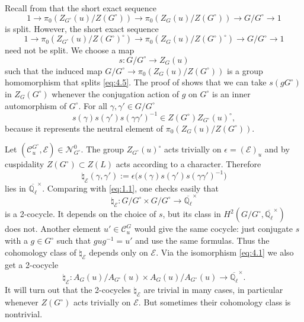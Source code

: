 \documentclass[11pt]{amsart}
\theoremstyle{definition}
\newcommand{\Q}{\mathbb Q}
\def\cC{{\mathcal C}}
\def\cN{{\mathcal N}}
\def\cE{{\mathcal E}}
\begin{document}
Recall from \cite[Lemma 4.2]{ABPS5} that the short exact sequence
\begin{equation}\label{eq:4.5}
1 \to \pi_0 (Z_{G^\circ}(u) / Z (G^\circ)) \to \pi_0 (Z_G (u) / Z(G^\circ)) 
\to G / G^\circ \to 1
\end{equation}
is split. However, the short exact sequence
\begin{equation}\label{eq:4.9}
1 \to \pi_0 (Z_{G^\circ}(u) / Z (G^\circ)^\circ ) \to 
\pi_0 (Z_G (u) / Z(G^\circ)^\circ) \to G / G^\circ \to 1
\end{equation}
need not be split. We choose a map 
\begin{equation}\label{eq:4.10}
s : G / G^\circ \to Z_G (u)  
\end{equation}
such that the induced map $G / G^\circ \to \pi_0 (Z_G (u) / Z(G^\circ))$ 
is a group homomorphism that splits \eqref{eq:4.5}. The proof of 
\cite[Lemma 4.2]{ABPS5} shows that we can take $s (g G^\circ)$ in $Z_G (G^\circ)$ 
whenever the conjugation action of $g$ on $G^\circ$ is an
inner automorphism of $G^\circ$. For all $\gamma,\gamma' \in G / G^\circ$
\[
s(\gamma) s(\gamma') s(\gamma \gamma')^{-1} \in Z(G^\circ) Z_{G^\circ}(u)^\circ ,
\]
because it represents the neutral element of $\pi_0 (Z_G (u) / Z(G^\circ))$.

Let $(\cC_u^{G^\circ},\cE) \in \cN_{G^\circ}^0$. 
The group $Z_{G^\circ}(u)^\circ$ acts trivially on $\epsilon = (\cE)_u$ and by 
cuspidality $Z(G^\circ) \subset Z(L)$ acts according to a character. Therefore
\begin{equation}\label{eq:4.6}
\natural_\cE (\gamma,\gamma') := \epsilon \big( s(\gamma) s(\gamma') 
s(\gamma \gamma')^{-1} \big)  
\end{equation}
lies in $\overline{\Q_{\ell}}^\times$. Comparing with \eqref{eq:1.1}, 
one checks easily that 
\begin{equation}\label{eq:4.12}
\natural_\cE : G / G^\circ \times G / G^\circ \to \overline{\Q_{\ell}}^\times
\end{equation}
is a 2-cocycle. It depends on the choice of $s$, but its class in $H^2 (G/G^\circ,
\overline{\Q_{\ell}}^\times)$ does not. Another element $u' \in \cC_u^G$
would give the same cocycle: just conjugate $s$ with a $g \in G^\circ$ such
that $g u g^{-1} = u'$ and use the same formulas. Thus the cohomology class of
$\natural_\cE$ depends only on $\cE$. 
Via the isomorphism \eqref{eq:4.1} we also get a 2-cocycle
\[
\natural_\cE : A_G (u) / A_{G^\circ} (u) \times A_G (u) / A_{G^\circ} (u) 
\to \overline{\Q_{\ell}}^\times .
\]
It will turn out that the 2-cocycles $\natural_\cE$ are trivial in many cases,
in particular whenever $Z(G^\circ)$ acts trivially on $\cE$. But sometimes
their cohomology class is nontrivial. 
\end{document}

